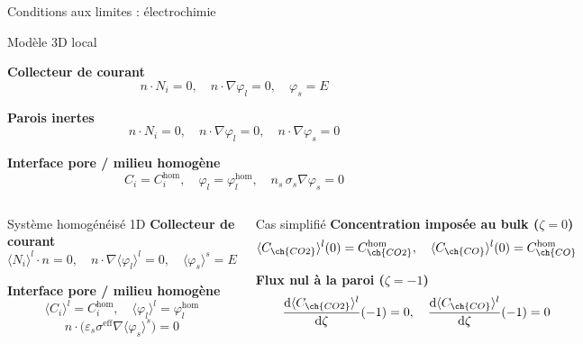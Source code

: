 
\begin{frame}[t]{Conditions aux limites : électrochimie}
  \vspace{-2.5em}
  \begin{pcbanner}{Modèle 3D local}
    \centering\scriptsize

    \textbf{Collecteur de courant}
    \[ n\!\cdot\!N_i = 0, \quad
       n\!\cdot\!\nabla\varphi_l = 0, \quad
       \varphi_s = E \]

    \textbf{Parois inertes}
    \[ n\!\cdot\!N_i = 0, \quad
       n\!\cdot\!\nabla\varphi_l = 0, \quad
       n\!\cdot\!\nabla\varphi_s = 0 \]

    \textbf{Interface pore / milieu homogène}
    \[ C_i = C_i^{\mathrm{hom}}, \quad
       \varphi_l = \varphi_l^{\mathrm{hom}}, \quad
       n_s\,\sigma_s\nabla\varphi_s = 0 \]
  \end{pcbanner}

  \vspace{-1.5em}

  \begin{columns}[T,onlytextwidth]
      \begin{pcbanner}{Système homogénéisé 1D}
        \centering\scriptsize
        \textbf{Collecteur de courant}
        \[ \langle N_i\rangle^l\!\cdot\!n = 0, \quad
           n\!\cdot\!\nabla\langle\varphi_l\rangle^l = 0, \quad
           \langle\varphi_s\rangle^s = E \]

        
        \textbf{Interface pore / milieu homogène}
        \[ \langle C_i\rangle^l = C_i^{\mathrm{hom}}, \quad
           \langle\varphi_l\rangle^l = \varphi_l^{\mathrm{hom}} \]
        \[ n\!\cdot\!\big(\varepsilon_s\sigma^{\mathrm{eff}}
           \nabla\langle\varphi_s\rangle^s\big) = 0 \]
      \end{pcbanner}

      \begin{pcbanner}{Cas simplifié }
        \centering\scriptsize
        \textbf{Concentration imposée au bulk ($\zeta = 0$)}
        \[ \langle C_{\ch{CO2}}\rangle^l(0) = C^{\mathrm{hom}}_{\ch{CO2}}, \quad
           \langle C_{\ch{CO}}\rangle^l(0) = C^{\mathrm{hom}}_{\ch{CO}} \]

        \vspace{0.3em}
        \textbf{Flux nul à la paroi ($\zeta = -1$)}
        \[ \frac{\mathrm{d}\langle C_{\ch{CO2}}\rangle^l}{\mathrm{d}\zeta}(-1) = 0, \quad
           \frac{\mathrm{d}\langle C_{\ch{CO}}\rangle^l}{\mathrm{d}\zeta}(-1) = 0 \]
      \end{pcbanner}

  \end{columns}

\end{frame}



